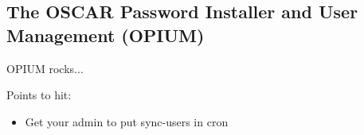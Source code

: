 %
%
%

\subsection{The OSCAR Password Installer and User Management (OPIUM)}
\label{app:opium-overview}

OPIUM rocks...

Points to hit:

\begin{itemize}
\item Get your admin to put sync-users in cron
\end{itemize}

